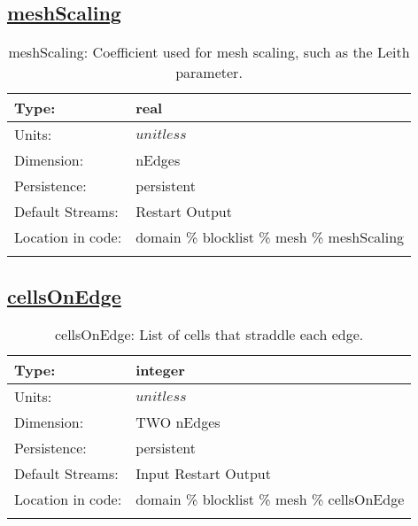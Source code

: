 \subsection[meshScaling]{\hyperref[sec:var_tab_mesh]{meshScaling}}
\label{subsec:var_sec_mesh_meshScaling}
\begin{center}
\begin{longtable}{| p{2.0in} | p{4.0in} |}
        \hline 
        Type: & real \\
        \hline 
        Units: & $unitless$ \\
        \hline 
        Dimension: & nEdges \\
        \hline 
        Persistence: & persistent \\
        \hline 
		 Default Streams: & Restart Output  \\
        \hline 
		 Location in code: & domain \% blocklist \% mesh \% meshScaling \\
		 \hline 
    \caption{meshScaling: Coefficient used for mesh scaling, such as the Leith parameter.}
\end{longtable}
\end{center}
\subsection[cellsOnEdge]{\hyperref[sec:var_tab_mesh]{cellsOnEdge}}
\label{subsec:var_sec_mesh_cellsOnEdge}
\begin{center}
\begin{longtable}{| p{2.0in} | p{4.0in} |}
        \hline 
        Type: & integer \\
        \hline 
        Units: & $unitless$ \\
        \hline 
        Dimension: & TWO nEdges \\
        \hline 
        Persistence: & persistent \\
        \hline 
		 Default Streams: & Input Restart Output  \\
        \hline 
		 Location in code: & domain \% blocklist \% mesh \% cellsOnEdge \\
		 \hline 
    \caption{cellsOnEdge: List of cells that straddle each edge.}
\end{longtable}
\end{center}
